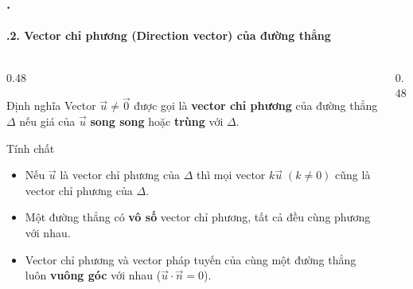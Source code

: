 \documentclass[11pt, aspectratio=169]{beamer}
\begin{document}
\begin{frame}[fragile]
    \frametitle{\thesection. \insertsection}
    \framesubtitle{\thesection.2. Vector chỉ phương (Direction vector) của đường thẳng}
    \vspace{-0.5cm}
    \begin{columns}[T, onlytextwidth]
        \begin{column}{0.48\textwidth}
            \begin{block}{Định nghĩa}
                \footnotesize
                Vector $\vec{u} \neq \vec{0}$ được gọi là \textbf{vector chỉ phương} của đường thẳng $\Delta$ nếu giá của $\vec{u}$ \textbf{song song} hoặc \textbf{trùng} với $\Delta$.
            \end{block}
            
            \vspace{0.1cm}
            
            \begin{block}{Tính chất}
                \footnotesize
                \begin{itemize}
                    \item Nếu $\vec{u}$ là vector chỉ phương của $\Delta$ thì mọi vector $k\vec{u}\;(k \neq 0)$ cũng là vector chỉ phương của $\Delta$.
                    \item Một đường thẳng có \textbf{vô số} vector chỉ phương, tất cả đều cùng phương với nhau.
                    \item Vector chỉ phương và vector pháp tuyến của cùng một đường thẳng luôn \textbf{vuông góc} với nhau ($\vec{u} \cdot \vec{n} = 0$).
                \end{itemize}
            \end{block}
        \end{column}
        

        \begin{column}{0.48\textwidth}
            \centering
\end{column}
\end{columns}
\end{frame}
\end{document}
